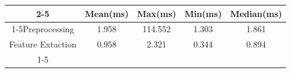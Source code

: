 \documentclass{standalone}
\begin{document}
 
 \begin{tabular}{|c |c |c |c |c |}
\cline{2-5}\cline{2-5} \multicolumn{1}{c |}{ } & Mean(ms) & Max(ms) & Min(ms) & Median(ms)\\ 
\cline{1-5}Preprocessing & 1.958 & 114.552 & 1.303 & 1.861\\ 
 \hhline{|=|=|=|=|=|}Feature Extaction & 0.958 & 2.321 & 0.344 & 0.894\\ 
 \cline{1-5}\hline \end{tabular}
 
\end{document}
